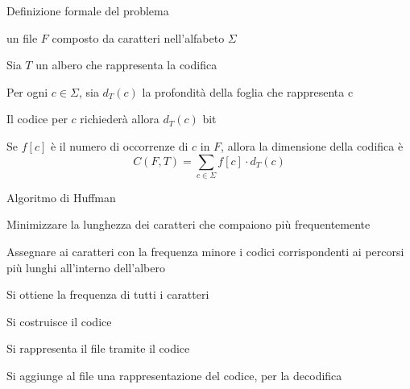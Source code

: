 \begin{frame}{Definizione formale del problema}

\vspace{-9pt}
\begin{myboxtitle}[Input]
\BI
\item un file $F$ composto da caratteri nell'alfabeto $\Sigma$
\EI
\end{myboxtitle}

\begin{myboxtitle}
\BI
\item Sia $T$ un albero che rappresenta la codifica
\item Per ogni $c \in \Sigma$, sia $d_T(c)$ la profondità della foglia che rappresenta c
\item Il codice per $c$ richiederà allora $d_T(c)$ bit
\item Se $f[c]$ è il numero di occorrenze di  $c$ in $F$, allora la dimensione della codifica è 
\[
  C(F,T) = \sum_{c \in \Sigma} f[c] \cdot d_T(c)
\]
\EI
\end{myboxtitle}

\end{frame}

\begin{frame}{Algoritmo di Huffman}

\vspace{-9pt}
\begin{myboxtitle}
\BIL
\item Minimizzare la lunghezza dei caratteri che compaiono più frequentemente
\item Assegnare ai caratteri con la frequenza minore i codici corrispondenti ai percorsi più lunghi all'interno dell'albero
\EIL
\end{myboxtitle}

\begin{myboxtitle}
\BIL
\item Si ottiene la frequenza di tutti i caratteri
\item Si costruisce il codice
\item Si rappresenta il file tramite il codice
\item Si aggiunge al file una rappresentazione del codice, per la decodifica
\EIL
\end{myboxtitle}

\end{frame}


